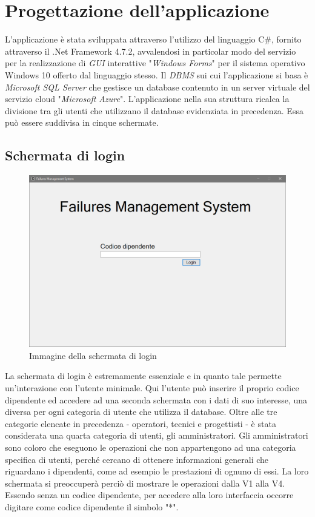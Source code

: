 \documentclass[a4paper, 12pt]{report}
\begin{document}
\chapter{Progettazione dell'applicazione}

L'applicazione è stata sviluppata attraverso l'utilizzo del linguaggio C\#, fornito attraverso il .Net Framework 4.7.2, avvalendosi in particolar modo del servizio per la realizzazione di \textit{GUI} interattive "\textit{Windows Forms}" per il sistema operativo Windows 10 offerto dal linguaggio stesso. Il \textit{DBMS} sui cui l'applicazione si basa è \textit{Microsoft SQL Server} che gestisce un database contenuto in un server virtuale del servizio cloud "\textit{Microsoft Azure}".\newline
L'applicazione nella sua struttura ricalca la divisione tra gli utenti che utilizzano il database evidenziata in precedenza. Essa può essere suddivisa in cinque schermate.

\section{Schermata di login}

\begin{figure}[H]
	\centering
	\includegraphics[width=\linewidth]{images/loginScreen.png}
	\caption{Immagine della schermata di login}
\end{figure}

La schermata di login è estremamente essenziale e in quanto tale permette un'interazione con l'utente minimale. Qui l'utente può inserire il proprio codice dipendente ed accedere
ad una seconda schermata con i dati di suo interesse, una diversa per ogni categoria di utente che utilizza il database. Oltre alle tre categorie elencate in precedenza - operatori,
tecnici e progettisti - è stata considerata una quarta categoria di utenti, gli amministratori. Gli amministratori sono coloro che eseguono le operazioni che non appartengono ad una
categoria specifica di utenti, perché cercano di ottenere informazioni generali che riguardano i dipendenti, come ad esempio le prestazioni di ognuno di essi.
La loro schermata si preoccuperà perciò di mostrare le operazioni dalla V1 alla V4. Essendo senza un codice dipendente, per accedere alla loro interfaccia
occorre digitare come codice dipendente il simbolo "*".
\end{document}
